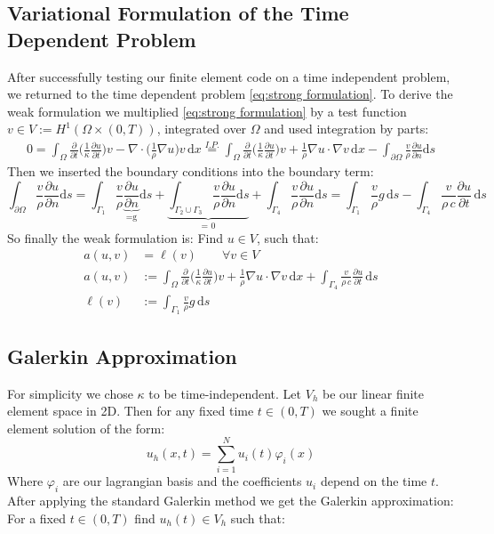 \documentclass{article}
\begin{document}
\subsection{Variational Formulation of the Time Dependent Problem}
After successfully testing our finite element code on a time independent problem, we returned to the time dependent problem \hyperref[eq:strong formulation]{\eqref{eq:strong formulation}}.
To derive the weak formulation we multiplied \hyperref[eq:strong formulation]{\eqref{eq:strong formulation}} by a test function $v\in V := H^1(\Omega \times (0,T))$, integrated over $\Omega$ and used integration by parts:
\begin{align*}
	0 = \int_{\Omega} \frac{\partial}{\partial t}\Big(\frac{1}{\kappa}\frac{\partial u}			{\partial t}\Big)v - \nabla \cdot \Big(\frac{1}{\rho}\nabla u\Big)v\,\text{d}x 					\overset{I.P.}{=}
	\int_{\Omega} \frac{\partial}{\partial t}\Big(\frac{1}{\kappa}								\frac{\partial u}{\partial t}\Big)v + \frac{1}{\rho}\nabla u \cdot \nabla v \, \text{d}x
	- \int_{\partial \Omega} \frac{v}{\rho} \frac{\partial u}{\partial n} \text{d}s
\end{align*}
Then we inserted the boundary conditions into the boundary term:
\[
	\int_{\partial \Omega} \frac{v}{\rho} \frac{\partial u}{\partial n} \text{d}s
	= \int_{\Gamma_1} \frac{v}{\rho} \underbrace{\frac{\partial u}{\partial n}}_{\text{=g}} \text{d}s + 
	\underbrace{\int_{\Gamma_2 \cup \Gamma_3} \frac{v}{\rho} \frac{\partial u}{\partial n} \text{d}s}_{\text{= 0} } + 
	\int_{\Gamma_4} \frac{v}{\rho} \frac{\partial u}{\partial n} \text{d}s
	= \int_{\Gamma_1} \frac{v}{\rho} g\, \text{d}s - 
	\int_{\Gamma_4}\frac{v}{\rho\, c} \frac{\partial u}{\partial t} \, \text{d}s
\]
So finally the weak formulation is: Find $u \in V$, such that:
\begin{equation}\label{eq:weak formulation}
	\begin{aligned}
	a(u,v) &= \ell(v)\qquad  \forall v\in V \\
	a(u,v) &:= \int_{\Omega} \frac{\partial}{\partial t}\Big(\frac{1}{\kappa}
	\frac{\partial u}{\partial t}\Big)v + \frac{1}{\rho}\nabla u \cdot \nabla v \, \text{d}x +
	\int_{\Gamma_4}\frac{v}{\rho\, c} \frac{\partial u}{\partial t} \, \text{d}s\\
	\ell(v) &:= \int_{\Gamma_1} \frac{v}{\rho} g\, \text{d}s 
	\end{aligned}
\end{equation}

\subsection{Galerkin Approximation}
For simplicity we chose $\kappa$ to be time-independent. Let $V_h$ be our linear finite element space in 2D. Then for any fixed time $t \in (0,T)$ we sought a finite element solution of the form: 
\[
	u_h(x,t) = \sum_{i=1}^N u_i(t) \varphi_i(x)
\]
Where $\varphi_i$ are our lagrangian basis and the coefficients $u_i$ depend on the time $t$. After applying the standard Galerkin method we get the Galerkin approximation: For a fixed $t\in (0,T)$ find $u_h(t) \in V_h$ such that: 
\end{document}
